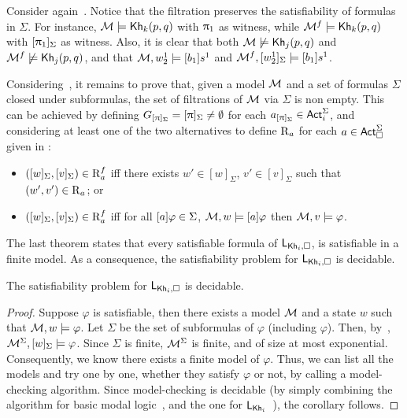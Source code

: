 \medskip 

\begin{example}\label{ex:filtration-preserves}
 Consider again~. Notice that the filtration preserves the satisfiability of formulas in $\Sigma$. For instance, $\mathcal{M}\models{\sf Kh}_k(p,q)$ with $\uppi_1$ as witness, while $\mathcal{M}^f\models{\sf Kh}_k(p,q)$ with $[\uppi_1]_\Sigma$ as witness. Also, it is clear that both $\mathcal{M}\not\models{\sf Kh}_j(p,q)$ and $\mathcal{M}^f\not\models{\sf Kh}_j(p,q)$, and that $\mathcal{M},w^1_2\models[b_1] s^1$ and $\mathcal{M}^f,[w^1_2]_\Sigma\models[b_1] s^1$.
\end{example}

\medskip

Considering~, it remains to prove that, given a model $\mathcal{M}$ and a set of formulas $\Sigma$ closed under subformulas, the set of filtrations of $\mathcal{M}$ via $\Sigma$ is non empty.
This can be achieved by defining $G_{[\uppi]_\Sigma} = [\uppi]_\Sigma \neq \emptyset$ for each $a_{[\uppi]_\Sigma} \in {\rm \sf Act}^\Sigma_i$, and considering at least one of the two alternatives to define $\operatorname{R}_a$ for each $a \in {\rm \sf Act}^\Sigma_\square$ given in \cite{HML,mlbook}:

\begin{itemize}
\item $([w]_\Sigma,[v]_\Sigma) \in \operatorname{R}^f_a$ iff there exists $w' \in [w]_\Sigma$, $v' \in [v]_\Sigma$ such that $(w',v') \in \operatorname{R}_a$; or
\item $([w]_\Sigma,[v]_\Sigma) \in \operatorname{R}^f_a$ iff for all $[a]\varphi \in \Sigma$, $\mathcal{M},w \models [a]\varphi$ then $\mathcal{M},v \models \varphi$.
\end{itemize}
 
\medskip

The last theorem states that every satisfiable formula of $\mathsf{L}_{{\sf Kh}_i,\square}$, is satisfiable in a finite model.
As a consequence, the satisfiability problem for $\mathsf{L}_{{\sf Kh}_i,\square}$ is decidable.

\medskip

\begin{corollary}\label{cor:extended-decidable}
The satisfiability problem for $\mathsf{L}_{{\sf Kh}_i,\square}$ is decidable.
\end{corollary}

\begin{proof}
Suppose $\varphi$ is satisfiable, then there exists a model $\mathcal{M}$ and a state $w$ such that $\mathcal{M},w\models\varphi$. Let $\Sigma$ be the set of subformulas of $\varphi$ (including $\varphi$). Then, by~, $\mathcal{M}^\Sigma,[w]_\Sigma\models\varphi$. Since $\Sigma$ is finite, $\mathcal{M}^\Sigma$ is finite, and of size at most exponential. Consequently, we know there exists a finite model of $\varphi$. Thus, we can list all the models and try one by one, whether they satisfy $\varphi$ or not, by calling a model-checking algorithm. Since model-checking is decidable (by simply combining the algorithm for basic modal logic~\cite{mlbook}, and the one for $\mathsf{L}_{{\sf Kh}_i}$~\cite{AFSVQ21,AFSVQ23report}), the corollary follows. 
\end{proof}

